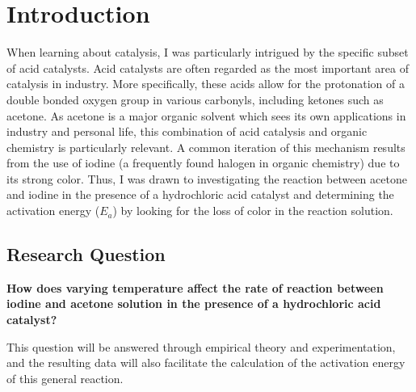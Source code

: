 \section{Introduction}
When learning about catalysis, I was particularly intrigued by the specific subset of acid catalysts. Acid catalysts are often regarded as the most important area of catalysis in industry. More specifically, these acids allow for the protonation of a double bonded oxygen group in various carbonyls, including ketones such as acetone. As acetone is a major organic solvent which sees its own applications in industry and personal life, this combination of acid catalysis and organic chemistry is particularly relevant. A common iteration of this mechanism results from the use of iodine (a frequently found halogen in organic chemistry) due to its strong color. Thus, I was drawn to investigating the reaction between acetone and iodine in the presence of a hydrochloric acid catalyst and determining the activation energy ($E_a$) by looking for the loss of color in the reaction solution.

\subsection{Research Question}
\textbf{How does varying temperature affect the rate of reaction between iodine and acetone solution in the presence of a hydrochloric acid catalyst?}

This question will be answered through empirical theory and experimentation, and the resulting data will also facilitate the calculation of the activation energy of this general reaction.
